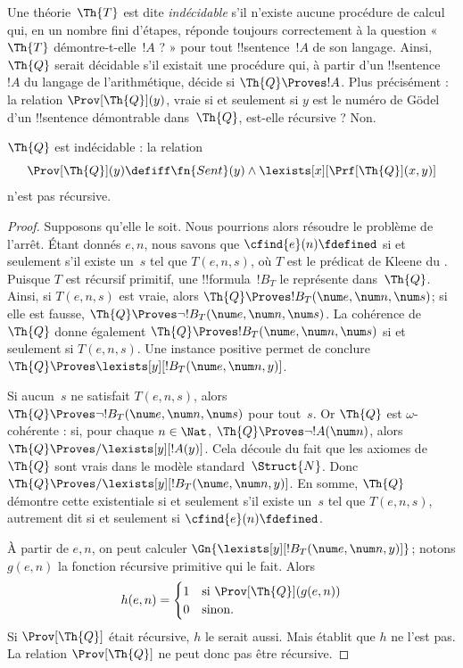 \documentclass[../../../include/open-logic-section]{subfiles}
\begin{document}

Une théorie~$\Th{T}$ est dite \emph{indécidable} s'il n'existe
aucune procédure de calcul qui, en un nombre fini d'étapes,
réponde toujours correctement à la question « $\Th{T}$
démontre-t-elle~$!A$ ? » pour tout !!{sentence}~$!A$ de son
langage. Ainsi, $\Th{Q}$ serait décidable s'il existait une
procédure qui, à partir d'un !!{sentence}~$!A$ du langage de
l'arithmétique, décide si $\Th{Q}\Proves !A$. Plus
précisément : la relation $\Prov[\Th{Q}](y)$, vraie si et
seulement si $y$ est le numéro de Gödel d'un !!{sentence}
démontrable dans~$\Th{Q}$, est-elle récursive ? Non.

\begin{thm}
$\Th{Q}$ est indécidable : la relation
\[
\Prov[\Th{Q}](y) \defiff \fn{Sent}(y) \land
\lexists[x][\Prf[\Th{Q}](x, y)]
\]
n'est pas récursive.
\end{thm}

\begin{proof}
Supposons qu'elle le soit. Nous pourrions alors résoudre le
problème de l'arrêt. Étant donnés $e,n$, nous savons que
$\cfind{e}(n)\fdefined$ si et seulement s'il existe un~$s$
tel que $T(e,n,s)$, où $T$ est le prédicat de Kleene du
. Puisque $T$ est
récursif primitif, une !!{formula}~$!B_T$ le représente
dans~$\Th{Q}$. Ainsi, si $T(e,n,s)$ est vraie, alors
$\Th{Q}\Proves !B_T(\num e,\num n,\num s)$; si elle est
fausse, $\Th{Q}\Proves\lnot !B_T(\num e,\num n,\num s)$.
La cohérence de $\Th{Q}$ donne également
$\Th{Q}\Proves !B_T(\num e,\num n,\num s)$ si et seulement
si $T(e,n,s)$. Une instance positive permet de conclure
$\Th{Q}\Proves\lexists[y][!B_T(\num e,\num n,y)]$.

Si aucun~$s$ ne satisfait $T(e,n,s)$, alors
$\Th{Q}\Proves\lnot !B_T(\num e,\num n,\num s)$
pour tout~$s$. Or $\Th{Q}$ est $\omega$-cohérente : si,
pour chaque $n\in\Nat$,
$\Th{Q}\Proves\lnot !A(\num n)$, alors
$\Th{Q}\Proves/\lexists[y][!A(y)]$.
Cela découle du fait que les axiomes de $\Th{Q}$ sont vrais
dans le modèle standard~$\Struct{N}$. Donc
$\Th{Q}\Proves/\lexists[y][!B_T(\num e,\num n,y)]$.
En somme, $\Th{Q}$ démontre cette existentiale si et
seulement s'il existe un~$s$ tel que $T(e,n,s)$, autrement
dit si et seulement si $\cfind{e}(n)\fdefined$.

À partir de $e,n$, on peut calculer
$\Gn{\lexists[y][!B_T(\num e,\num n,y)]}$; notons
$g(e,n)$ la fonction récursive primitive qui le fait.
Alors
\[
h(e, n) =
\begin{cases}
1 & \text{si $\Prov[\Th{Q}](g(e, n))$}\\
0 & \text{sinon}.
\end{cases}
\]
Si $\Prov[\Th{Q}]$ était récursive, $h$ le serait
aussi. Mais 
établit que $h$ ne l'est pas. La relation
$\Prov[\Th{Q}]$ ne peut donc pas être récursive.
\end{proof}
\end{document}
